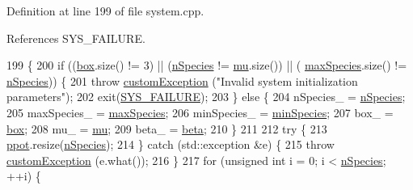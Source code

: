 Definition at line 199 of file system.\+cpp.



References S\+Y\+S\+\_\+\+F\+A\+I\+L\+U\+R\+E.


\begin{DoxyCode}
199                                                                                                            
                                                                                                      \{
200                 \textcolor{keywordflow}{if} ((\hyperlink{classsim_system_a8bff9dfb95b1b09a0fab2c1c485ade07}{box}.size() != 3) || (\hyperlink{classsim_system_ab5e2e9b6204de15520302fe1d51688dd}{nSpecies} != \hyperlink{classsim_system_af1e3f5320aff976a448647244d5950d1}{mu}.size()) || (
      \hyperlink{classsim_system_a93259b517f449f1ac610d132ac66b551}{maxSpecies}.size() != \hyperlink{classsim_system_ab5e2e9b6204de15520302fe1d51688dd}{nSpecies})) \{
201                                 \textcolor{keywordflow}{throw} \hyperlink{classcustom_exception}{customException} (\textcolor{stringliteral}{"Invalid system initialization
       parameters"});
202                                 exit(\hyperlink{global_8h_a428dfe1ef0a6ff4b1fdebf275f6aff2e}{SYS\_FAILURE});
203                 \} \textcolor{keywordflow}{else} \{
204                                 nSpecies\_ = \hyperlink{classsim_system_ab5e2e9b6204de15520302fe1d51688dd}{nSpecies};
205         maxSpecies\_ = \hyperlink{classsim_system_a93259b517f449f1ac610d132ac66b551}{maxSpecies};
206         minSpecies\_ = \hyperlink{classsim_system_afafda4a09ed180ee9c5580d196d8ca9f}{minSpecies};
207                                 box\_ = \hyperlink{classsim_system_a8bff9dfb95b1b09a0fab2c1c485ade07}{box};
208                                 mu\_ = \hyperlink{classsim_system_af1e3f5320aff976a448647244d5950d1}{mu};
209                                 beta\_ = \hyperlink{classsim_system_a3eeec9678902f8d7fce4dad6064aaf4c}{beta};
210                 \}
211                 
212                 \textcolor{keywordflow}{try} \{
213                                 \hyperlink{classsim_system_a8d6271751a62f61edcf57f773540a4a3}{ppot}.resize(\hyperlink{classsim_system_ab5e2e9b6204de15520302fe1d51688dd}{nSpecies});
214                 \} \textcolor{keywordflow}{catch} (std::exception &e) \{
215                                 \textcolor{keywordflow}{throw} \hyperlink{classcustom_exception}{customException} (e.what());
216                 \}
217                 \textcolor{keywordflow}{for} (\textcolor{keywordtype}{unsigned} \textcolor{keywordtype}{int} i = 0; i < \hyperlink{classsim_system_ab5e2e9b6204de15520302fe1d51688dd}{nSpecies}; ++i) \{

\end{DoxyCode}
